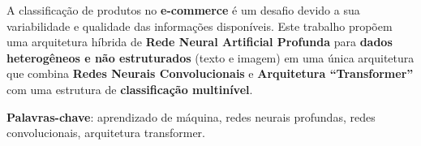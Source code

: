 \begin{resumo}

A classificação de produtos no \textbf{e-commerce} é um desafio devido a sua variabilidade e qualidade das informações disponíveis. Este trabalho propõem uma arquitetura híbrida de \textbf{Rede Neural Artificial Profunda} para \textbf{dados heterogêneos e não estruturados} (texto e imagem) em uma única arquitetura que combina \textbf{Redes Neurais Convolucionais} e \textbf{Arquitetura “Transformer”} com uma estrutura de \textbf{classificação multinível}.

\vspace{\onelineskip}
 
\noindent
\textbf{Palavras-chave}: aprendizado de máquina, redes neurais profundas, redes convolucionais, arquitetura transformer.

\end{resumo}